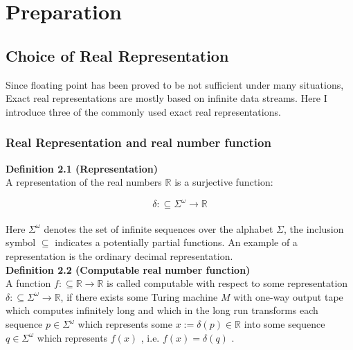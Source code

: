 \documentclass[12pt,twoside,notitlepage]{report}
\begin{document}
\cleardoublepage



\chapter{Preparation}

\section {Choice of Real Representation}

Since floating point has been proved to be not sufficient under many situations, Exact real representations are mostly based on infinite data streams. Here I introduce three of the commonly used exact real representations.  
\subsection {Real Representation and real number function}



\textbf{Definition 2.1 (Representation)} \cite{weihrauchd} \\
A representation of the real numbers $\mathbb{R}$ is a surjective function: 

\begin{equation}
\delta : \subseteq \Sigma^{\omega} \rightarrow \mathbb{R}
\end{equation}\\
Here $\Sigma^{\omega}$ denotes the set of infinite sequences over the alphabet $\Sigma$, the inclusion symbol $\subseteq$ indicates a potentially partial functions. An example of a representation is the ordinary decimal representation.\\
\textbf{Definition 2.2 (Computable real number function)} \cite{weihrauchd}\\
A function $\textit{f}  : \subseteq \mathbb{R} \rightarrow \mathbb{R}$ is called computable with respect to some representation $\delta : \subseteq \Sigma^{\omega} \rightarrow \mathbb{R}$, if there exists some Turing machine $M$ with one-way output tape which computes infinitely long and which in the long run transforms each sequence $p\in\Sigma^{\omega}$ which represents some $x:=\delta(p)\in \mathbb{R}$ into some sequence $q\in\Sigma^{\omega}$ which represents $f(x)$ , i.e. $f(x)=\delta(q)$ .\\
\end{document}
